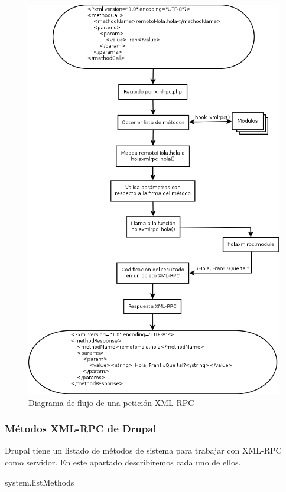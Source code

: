 \begin{figure}[h]
  \centering
    \includegraphics[width=1\textwidth]{Assets/xmlrpc/Imagenes/workflow.png}
  \caption{Diagrama de flujo de una petición XML-RPC}
\end{figure}

\newpage
\subsubsection{Métodos XML-RPC de Drupal}

Drupal tiene un listado de métodos de sistema para trabajar con XML-RPC como servidor. En este apartado describiremos 
cada uno de ellos.

\large{system.listMethods} 	

